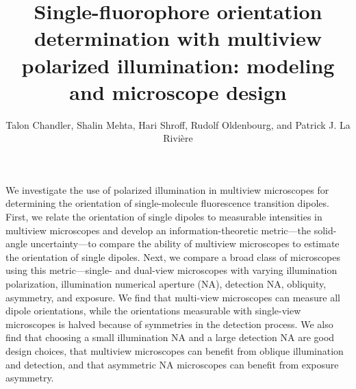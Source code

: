 \documentclass[10pt]{article}
\begin{document}
\title{Single-fluorophore orientation determination with multiview polarized
  illumination: modeling and microscope design}

\author{Talon Chandler, Shalin Mehta, Hari
  Shroff, Rudolf Oldenbourg, and Patrick J. La
  Rivi\`ere}
\address{University of Chicago, Department of Radiology, Chicago, Illinois 60637, USA\\
  Marine Biological Laboratory, Bell Center, Woods Hole, Massachusetts 02543, USA\\
  (present address) Chan Zuckerberg Biohub, San Francisco, California 94158, USA\\
  Section on High Resolution Optical Imaging, National Institute
  of Biomedical Imaging and Bioengineering, National Institutes of Health,
  Bethesda, Maryland 20892, USA\\
  Marine Biological Laboratory, Whitman Center, Woods Hole,
  Massachusetts 02543, USA\\
  Brown University, Department of Physics, Providence, Rhode
  Island 02912, USA}

\begin{abstract*}
  We investigate the use of polarized illumination in multiview microscopes for
  determining the orientation of single-molecule fluorescence transition
  dipoles. First, we relate the orientation of single dipoles to measurable
  intensities in multiview microscopes and develop an information-theoretic
  metric---the solid-angle uncertainty---to compare the ability of multiview
  microscopes to estimate the orientation of single dipoles. Next, we compare
  a broad class of microscopes using this metric---single- and dual-view
  microscopes with varying illumination polarization, illumination numerical
  aperture (NA), detection NA, obliquity, asymmetry, and exposure. We find that
  multi-view microscopes can measure all dipole orientations, while the
  orientations measurable with single-view microscopes is halved because of
  symmetries in the detection process. We also find that choosing a small
  illumination NA and a large detection NA are good design choices, that
  multiview microscopes can benefit from oblique illumination and detection, and
  that asymmetric NA microscopes can benefit from exposure asymmetry.
\end{abstract*}
\end{document}
